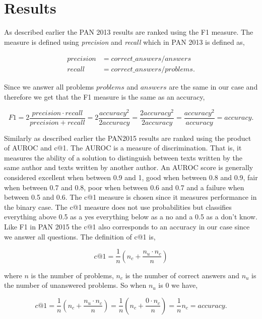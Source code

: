 \section{Results} \label{sec:results}
As described earlier the PAN 2013 results are ranked using the F1 measure. The
measure is defined using \textit{precision} and \textit{recall} which in PAN 2013
is defined as,

\begin{align}
    precision &=  correct\_answers / answers \\
    recall &= correct\_answers / problems.
\end{align}

Since we answer all problems $problems$ and $answers$ are the same in our case
and therefore we get that the F1 measure is the same as an accuracy,

\begin{equation}
    F1 = 2 \frac{precision \cdot recall}{precision + recall}
        = 2 \frac{accuracy^2}{2accuracy}
        = \frac{2accuracy^2}{2accuracy}
        = \frac{accuracy^2}{accuracy}
        = accuracy.
\end{equation}

Similarly as described earlier the PAN2015 results are ranked using the product
of \gls{AUROC} and c@1. The \gls{AUROC} is a measure of discrimination. That
is, it measures the ability of a solution to distinguish between texts written
by the same author and texts written by another author. An \gls{AUROC} score is
generally considered excellent when between 0.9 and 1, good when between 0.8
and 0.9, fair when between 0.7 and 0.8, poor when between 0.6 and 0.7 and a
failure when between 0.5 and 0.6. The c@1 measure is chosen since it measures
performance in the binary case. The c@1 measure does not use probabilities but
classifies everything above 0.5 as a yes everything below as a no and a 0.5 as a
don't know. Like F1 in PAN 2015 the c@1 also corresponds to an accuracy in our
case since we answer all questions. The definition of c@1 is,

\begin{equation}
    c@1 = \frac{1}{n} \left(n_c + \frac{n_u \cdot n_c}{n}\right)
\end{equation}

where $n$ is the number of problems, $n_c$ is the number of correct answers and
$n_u$ is the number of unanswered problems. So when $n_u$ is 0 we have,

\begin{equation}
    c@1 = \frac{1}{n} \left(n_c + \frac{n_u \cdot n_c}{n}\right)
        = \frac{1}{n} \left(n_c + \frac{0 \cdot n_c}{n}\right)
        = \frac{1}{n} n_c
        = accuracy.
\end{equation}

